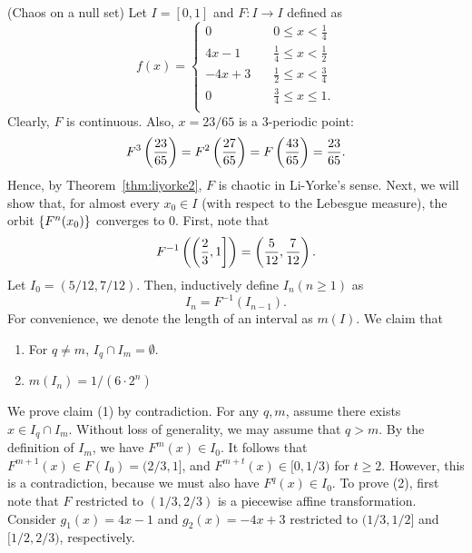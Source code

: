 \documentclass[10pt,draft,twoside]{book}
\begin{document}
\begin{example}
  (Chaos on a null set)
  Let $I = [0,1]$ and $F: I \to I$ defined as
  \begin{equation*}
    f(x) =
    \begin{cases}
      0 \quad & 0\leq x < \frac{1}{4} \\
      4x - 1 \quad  & \frac{1}{4} \leq x < \frac{1}{2} \\
      -4x + 3 \quad & \frac{1}{2} \leq x < \frac{3}{4} \\
      0 \quad & \frac{3}{4} \leq x \leq 1. \\
    \end{cases}
  \end{equation*}
  Clearly, $F$ is continuous.
  Also, $x = 23/65$ is a 3-periodic point:
  \begin{equation*}
    F^{3}\left ( \frac{23}{65} \right ) = F^{2}\left ( \frac{27}{65} \right ) = F\left ( \frac{43}{65} \right ) = \frac{23}{65}.
  \end{equation*}
Hence, by Theorem~\ref{thm:liyorke2}, $F$ is chaotic in Li-Yorke's sense.
%
Next, we will show that, for almost every $x_0 \in I$ (with respect to the Lebesgue measure), the orbit $\left \{ F^{n}(x_0) \right \}$ converges to 0.
First, note that 
\begin{equation*}
  F^{-1}\left ( \left(\frac{2}{3},1\right] \right ) 
  = \left ( \frac{5}{12},\frac{7}{12} \right ).
\end{equation*}
Let $I_0 = (5/12, 7/12)$.
Then, inductively define $I_n (n\geq 1)$ as 
\begin{equation*}
  I_n = F^{-1}(I_{n-1}).
\end{equation*}
%
For convenience, we denote the length of an interval as $m(I)$.
We claim that
\begin{enumerate}[(1)]
  \item For $q\neq m$, $I_q \cap I_m = \emptyset$.
  \item $m(I_n) = 1/(6 \cdot 2^n)$
\end{enumerate}
%
We prove claim (1) by contradiction.
For any $q,m$, assume there exists $x \in I_q \cap I_m$. 
Without loss of generality, we may assume that $q > m$.
By the definition of $I_m$, we have $F^m(x) \in I_0$.
It follows that $F^{m+1}(x) \in F(I_0) = (2/3, 1]$, and $F^{m+t}(x) \in [0, 1/3)$ for $t \geq 2$.
However, this is a contradiction, because we must also have $F^q(x) \in I_0$.
%
To prove (2), first note that $F$ restricted to $(1/3, 2/3)$ is a piecewise affine transformation.
Consider $g_1(x) = 4x - 1$ and $g_2(x) = -4x + 3$ restricted to $(1/3,1/2]$ and $[1/2,2/3)$, respectively.

\end{example}
\end{document}

